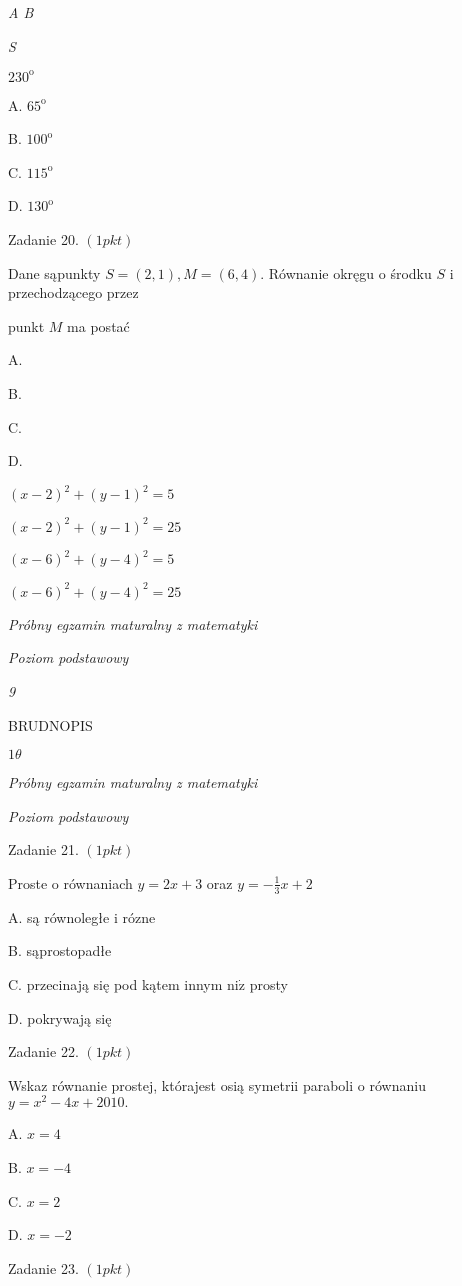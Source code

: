 \documentclass[a4paper,12pt]{article}
\begin{document}
{\it A  B}

{\it S}

$230^{\mathrm{o}}$

A. $65^{\mathrm{o}}$

B. $100^{\mathrm{o}}$

C. $115^{\mathrm{o}}$

D. $130^{\mathrm{o}}$

Zadanie 20. $(1pkt)$

Dane sąpunkty $S=(2,1), M=(6,4)$. Równanie okręgu o środku $S$ i przechodzącego przez

punkt $M$ ma postać

A.

B.

C.

D.

$(x-2)^{2}+(y-1)^{2}=5$

$(x-2)^{2}+(y-1)^{2}=25$

$(x-6)^{2}+(y-4)^{2}=5$

$(x-6)^{2}+(y-4)^{2}=25$





{\it Próbny egzamin maturalny z matematyki}

{\it Poziom podstawowy}

{\it 9}

BRUDNOPIS





$ 1\theta$

{\it Próbny egzamin maturalny z matematyki}

{\it Poziom podstawowy}

Zadanie 21. $(1pkt)$

Proste o równaniach $y=2x+3$ oraz $y=-\displaystyle \frac{1}{3}x+2$

A. są równoległe i rózne

B. sąprostopadłe

C. przecinają się pod kątem innym $\mathrm{n}\mathrm{i}\dot{\mathrm{z}}$ prosty

D. pokrywają się

Zadanie 22. $(1pkt)$

Wskaz równanie prostej, którajest osią symetrii paraboli o równaniu $y=x^{2}-4x+2010.$

A. $x=4$

B. $x=-4$

C. $x=2$

D. $x=-2$

Zadanie 23. $(1pkt)$
\end{document}
